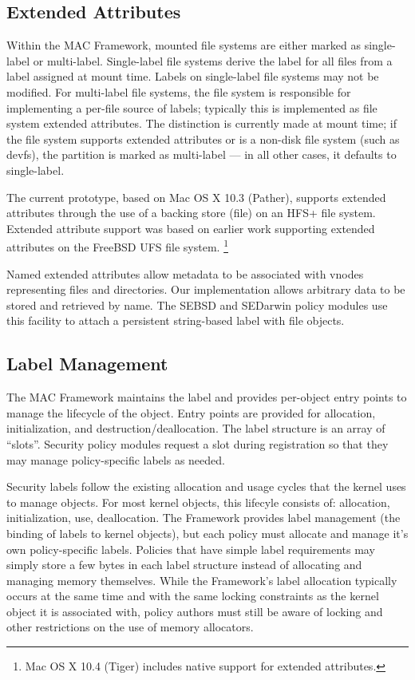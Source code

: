 \subsection{Extended Attributes}

Within the MAC Framework, mounted file systems are either marked as
single-label or multi-label.  Single-label file systems derive the
label for all files from a label assigned at mount time.  Labels on
single-label file systems may not be modified.  For multi-label file
systems, the file system is responsible for implementing a per-file
source of labels; typically this is implemented as file system
extended attributes.  The distinction is currently made at mount time; if the
file system supports extended attributes or is a non-disk file system (such as devfs), the partition is marked as
multi-label --- in all other cases, it defaults to single-label.

The current prototype, based on Mac OS X 10.3 (Pather), supports
extended attributes through the use of a backing store (file) on
an HFS+ file system.  Extended attribute support was based on earlier
work supporting extended attributes on the FreeBSD UFS file system.
\footnote{Mac OS X 10.4 (Tiger) includes native support for extended attributes.}

Named extended attributes allow metadata to be associated with vnodes
representing files and directories.  Our implementation allows
arbitrary data to be stored and retrieved by name.  The SEBSD and SEDarwin policy modules
use this facility to attach a persistent string-based label with file
objects.

\subsection{Label Management}

The MAC Framework maintains the label and provides per-object entry
points to manage the lifecycle of the object.  Entry points are
provided for allocation, initialization, and destruction/deallocation.
The label structure is an array of ``slots''. Security policy modules
request a slot during registration so that they may manage
policy-specific labels as needed.

Security labels follow the existing allocation and usage cycles that the
kernel uses to manage objects.  For most kernel objects, this lifecyle consists of: allocation, initialization, use, deallocation.  The Framework provides label
management (the binding of labels to kernel objects), but each policy
must allocate and manage it's own policy-specific labels. Policies that
have simple label requirements may simply store a few bytes in each label
structure instead of allocating and managing memory themselves.
While the Framework's label allocation typically occurs at the same
time and with the same locking constraints as the kernel object it is
associated with, policy authors must still be aware of locking and
other restrictions on the use of memory allocators.

